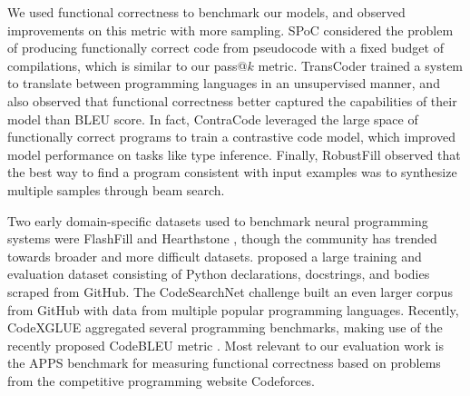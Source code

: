 We used functional correctness to benchmark our models, and observed improvements on this metric with more sampling. SPoC \cite{kulal2019spoc} considered the problem of producing functionally correct code from pseudocode with a fixed budget of compilations, which is similar to our pass@$k$ metric. TransCoder \citep{lachaux2020unsuptrans} trained a system to translate between programming languages in an unsupervised manner, and also observed that functional correctness better captured the capabilities of their model than BLEU score. In fact, ContraCode \citep{jain2020ccr} leveraged the large space of functionally correct programs to train a contrastive code model, which improved model performance on tasks like type inference. Finally, RobustFill \citep{devlin2017robustfill} observed that the best way to find a program consistent with input examples was to synthesize multiple samples through beam search. 

Two early domain-specific datasets used to benchmark neural programming systems were FlashFill \citep{gulwani2011automating,gulwani2012autosp2} and Hearthstone \citep{ling2016latent}, though the community has trended towards broader and more difficult datasets. \citet{barone2017apc} proposed a large training and evaluation dataset consisting of Python declarations, docstrings, and bodies scraped from GitHub. The CodeSearchNet challenge \citep{husain2019codesearchnet} built an even larger corpus from GitHub with data from multiple popular programming languages. Recently, CodeXGLUE \citep{lu2021codexglue} aggregated several programming benchmarks, making use of the recently proposed CodeBLEU metric \citep{ren2020codebleu}. Most relevant to our evaluation work is the APPS \citep{hendrycks2021apps} benchmark for measuring functional correctness based on problems from the competitive programming website Codeforces.

